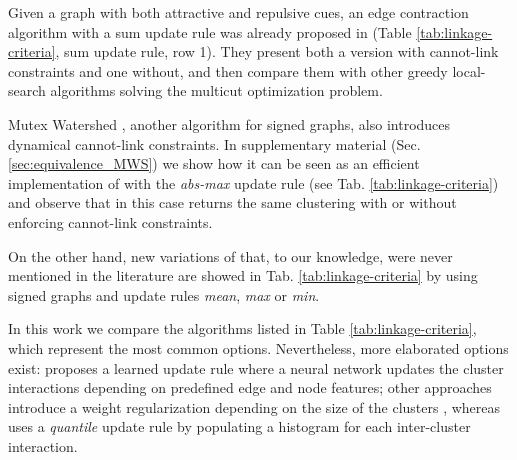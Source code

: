 Given a graph with both attractive and repulsive cues, an edge contraction algorithm with a sum update rule was already proposed in \cite{levinkov2017comparative,keuper2015efficient} (Table \ref{tab:linkage-criteria}, sum update rule, row 1). They present both a version with cannot-link constraints and one without, and then compare them with other greedy local-search algorithms solving the multicut optimization problem.

Mutex Watershed \cite{wolf2018mutex}, another algorithm for signed graphs, also introduces dynamical cannot-link constraints. In supplementary material (Sec. \ref{sec:equivalence_MWS}) we show how it can be seen as an efficient implementation of \algname{} with the \emph{abs-max} update rule (see Tab. \ref{tab:linkage-criteria}) and observe that in this case \algname{} returns the same clustering with or without enforcing cannot-link constraints.

On the other hand, new variations of \algname{} that, to our knowledge, were never mentioned in the literature are showed in Tab. \ref{tab:linkage-criteria} by using signed graphs and update rules \emph{mean}, \emph{max} or \emph{min}. 

In this work we compare the algorithms listed in Table \ref{tab:linkage-criteria}, which represent the most common options. 
Nevertheless, more elaborated options exist: \cite{nunez2013machine} proposes a learned update rule where a neural network updates the cluster interactions depending on predefined edge and node features; other approaches introduce a weight regularization depending on the size of the clusters \cite{felzenszwalb2004efficient,kardoostsolving}, whereas 
\cite{funke2018large} uses a \emph{quantile} update rule by populating a histogram for each inter-cluster interaction.

